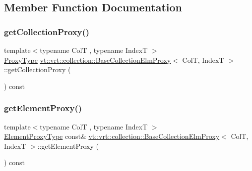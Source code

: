 \subsection{Member Function Documentation}
\mbox{\label{structvt_1_1vrt_1_1collection_1_1_base_collection_elm_proxy_ae2b8c7f266600f1c68c2036f6be2a463}} 
\subsubsection{\texorpdfstring{get\+Collection\+Proxy()}{getCollectionProxy()}}
{\footnotesize\ttfamily template$<$typename ColT , typename IndexT $>$ \\
\hyperlink{structvt_1_1vrt_1_1collection_1_1_base_collection_elm_proxy_af80f1576659b626a30828c6d85eca926}{Proxy\+Type} \hyperlink{structvt_1_1vrt_1_1collection_1_1_base_collection_elm_proxy}{vt\+::vrt\+::collection\+::\+Base\+Collection\+Elm\+Proxy}$<$ ColT, IndexT $>$\+::get\+Collection\+Proxy (\begin{DoxyParamCaption}{ }\end{DoxyParamCaption}) const\hspace{0.3cm}{\ttfamily [inline]}}

\mbox{\label{structvt_1_1vrt_1_1collection_1_1_base_collection_elm_proxy_a1c9b3e1ffc06c20783a1bfcc09e70d53}} 
\subsubsection{\texorpdfstring{get\+Element\+Proxy()}{getElementProxy()}}
{\footnotesize\ttfamily template$<$typename ColT , typename IndexT $>$ \\
\hyperlink{structvt_1_1vrt_1_1collection_1_1_base_collection_elm_proxy_a0f37a49c04c28fdc6ea8665aefc2f40c}{Element\+Proxy\+Type} const\& \hyperlink{structvt_1_1vrt_1_1collection_1_1_base_collection_elm_proxy}{vt\+::vrt\+::collection\+::\+Base\+Collection\+Elm\+Proxy}$<$ ColT, IndexT $>$\+::get\+Element\+Proxy (\begin{DoxyParamCaption}{ }\end{DoxyParamCaption}) const\hspace{0.3cm}{\ttfamily [inline]}}

